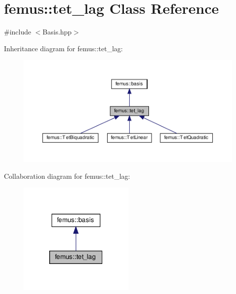 \hypertarget{classfemus_1_1tet__lag}{}\section{femus\+:\+:tet\+\_\+lag Class Reference}
\label{classfemus_1_1tet__lag}


{\ttfamily \#include $<$Basis.\+hpp$>$}



Inheritance diagram for femus\+:\+:tet\+\_\+lag\+:
\nopagebreak
\begin{figure}[H]
\begin{center}
\leavevmode
\includegraphics[width=350pt]{classfemus_1_1tet__lag__inherit__graph}
\end{center}
\end{figure}


Collaboration diagram for femus\+:\+:tet\+\_\+lag\+:
\nopagebreak
\begin{figure}[H]
\begin{center}
\leavevmode
\includegraphics[width=160pt]{classfemus_1_1tet__lag__coll__graph}
\end{center}
\end{figure}
